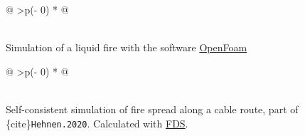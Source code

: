 \documentclass[
  letterpaper,
  DIV=11,
  numbers=noendperiod]{scrreprt}
\begin{document}
\begin{longtable}[]{@{}
  >{\centering\arraybackslash}p{(\columnwidth - 0\tabcolsep) * }@{}}
\toprule\noalign{}
\begin{minipage}[b]{\linewidth}\centering
\end{minipage} \\
\midrule\noalign{}
\endhead
\bottomrule\noalign{}
\endlastfoot
Simulation of a liquid fire with the software
\href{https://www.openfoam.com/}{OpenFoam} \\
\end{longtable}

\begin{longtable}[]{@{}
  >{\centering\arraybackslash}p{(\columnwidth - 0\tabcolsep) * }@{}}
\toprule\noalign{}
\begin{minipage}[b]{\linewidth}\centering
\end{minipage} \\
\midrule\noalign{}
\endhead
\bottomrule\noalign{}
\endlastfoot
Self-consistent simulation of fire spread along a cable route, part of
\{cite\}\texttt{Hehnen.2020}. Calculated with
\href{https://pages.nist.gov/fds-smv/}{FDS}. \\
\end{longtable}
\end{document}
